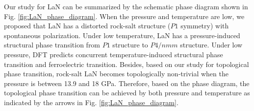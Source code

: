 	Our study for LaN can be summarized by the schematic phase diagram shown in Fig. \ref{fig:LaN_phase_diagram}. When the pressure and temperature are low, we proposed that LaN has a distorted rock-salt structure ($P1$ symmetry) with spontaneous polarization. Under low temperature, LaN has a pressure-induced structural phase transition from $P1$ structure to $P4/nmm$ structure. Under low pressure, DFT predicts concurrent temperature-induced structural phase transition and ferroelectric transition. Besides, based on our study for topological phase transition, rock-salt LaN becomes topologically non-trivial when the pressure is between 13.9 and 18 GPa. Therefore, based on the phase diagram, the topological phase transition can be achieved by both pressure and temperature as indicated by the arrows in Fig. \ref{fig:LaN_phase_diagram}.



	



